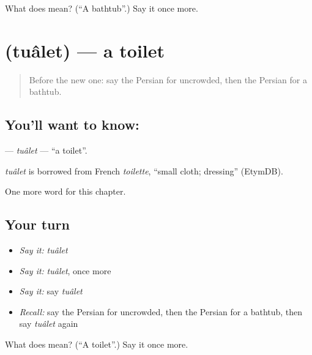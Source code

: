 \begin{tcolorbox}[breakable,colback=teal!4,colframe=teal!35!black,title={Before you move on}]
What does  mean? (\textquotedblleft{}A bathtub\textquotedblright{}.) Say it once more.
\end{tcolorbox}
\section[\texorpdfstring{\fa{توالت} (tuâlet)}{توالت (tuâlet)}]{ (tuâlet) — a toilet}

\label{lesson:FA-C165-tualet}



\begin{quote}
Before the new one: say the Persian for uncrowded, then the Persian for a bathtub.
\end{quote}

\subsection*{You'll want to know: }
\textbf{} — \emph{tuâlet} — \textquotedblleft{}a toilet\textquotedblright{}.

\begin{cousinweb}
\emph{tuâlet} is borrowed from French \emph{toilette}, \textquotedblleft{}small cloth; dressing\textquotedblright{} (EtymDB).
\end{cousinweb}

\begin{grammarlens}[title={What you've built}]
One more word for this chapter.
\end{grammarlens}

\subsection*{Your turn}
\begin{itemize}
\raggedright
  \item \emph{Say it:} \emph{tuâlet}
  \item \emph{Say it:} \emph{tuâlet}, once more
  \item \emph{Say it:} say \emph{tuâlet}
  \item \emph{Recall:} say the Persian for uncrowded, then the Persian for a bathtub, then say \emph{tuâlet} again
\end{itemize}

\begin{tcolorbox}[breakable,colback=teal!4,colframe=teal!35!black,title={Before you move on}]
What does  mean? (\textquotedblleft{}A toilet\textquotedblright{}.) Say it once more.
\end{tcolorbox}
